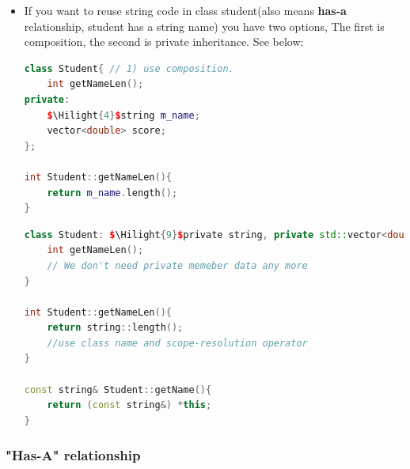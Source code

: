 \documentclass[a4paper,11pt,twoside]{book}
\newcommand{\Hilight}[1]{\makebox[0pt][l]{\color{yellow}\rule[-3pt]{#1em}{11pt}}}
\newcommand{\Hilight}[1]{}
\begin{document}
\begin{itemize}
\item If you want to reuse string code in class student(also means \textbf{has-a} relationship, student has a string name) you have two options, The first is composition,  the second is private inheritance. See below:
\begin{lstlisting}[frame=single, language=c++, mathescape=true]
class Student{ // 1) use composition.
	int getNameLen();
private:
	$\Hilight{4}$string m_name;
	vector<double> score;
};

int Student::getNameLen(){
	return m_name.length();
}
\end{lstlisting}

\begin{lstlisting}[frame=single, language=c++, mathescape=true]
class Student: $\Hilight{9}$private string, private std::vector<double>{
	int getNameLen();
	// We don't need private memeber data any more
}

int Student::getNameLen(){
	return string::length();
	//use class name and scope-resolution operator
}

const string& Student::getName(){
	return (const string&) *this;
}
\end{lstlisting}
\end{itemize}

\subsubsection{"Has-A" relationship}
\end{document}
